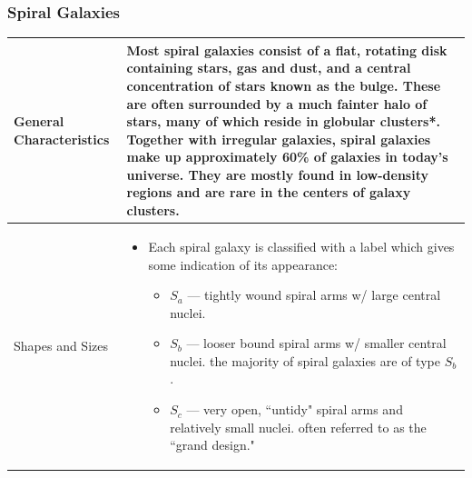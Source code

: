 \subsubsection{Spiral Galaxies}
\begin{longtabu} to 
\hline
	General Characteristics &
	Most spiral galaxies consist of a flat, rotating disk containing stars, gas and dust, and a central concentration of stars known as the bulge. These are often surrounded by a much fainter halo of stars, many of which reside in \gls{globular cluster}s*. Together with irregular galaxies, spiral galaxies make up approximately 60\% of galaxies in today's universe. They are mostly found in low-density regions and are rare in the centers of galaxy clusters.
	\\
	\hline
	Shapes and Sizes &
	\begin{itemize}[noitemsep]
		\item Each spiral galaxy is classified with a label which gives some indication of its appearance:
			\begin{itemize}[noitemsep]
				\item \textbf{$S_{a}$} --- tightly wound spiral arms w/ large central nuclei. 
				\item \textbf{$S_{b}$} --- looser bound spiral arms w/ smaller central nuclei. the majority of spiral galaxies are of type $S_{b}$.
				\item \textbf{$S_{c}$} --- very open, ``untidy" spiral arms and relatively small nuclei. often referred to as the ``grand design."
				

\end{itemize}
\end{itemize}
\end{longtabu}

